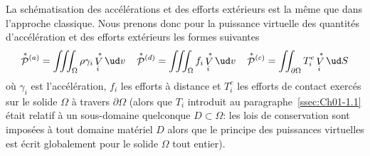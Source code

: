 La schématisation des accélérations et des efforts extérieurs est la même que dans l'approche classique.
Nous prenons donc pour la puissance virtuelle des quantités d'accélération et des efforts extérieurs les formes suivantes
\begin{equation}
    \mathop{\mathcal{P}}^{\ast}{\!}^{(a)} = \iiint_{\Omega} \rho \gamma_i \mathop{V}^{\ast}_i \ud v \quad
    \mathop{\mathcal{P}}^{\ast}{\!}^{(d)} = \iiint_{\Omega} f_i \mathop{V}^{\ast}_i \ud v \quad
    \mathop{\mathcal{P}}^{\ast}{\!}^{(c)} = \iint_{\partial\Omega} T_i^e \mathop{V}^{\ast}_i \ud S
    \label{eq:Ch01-33}
\end{equation}
où $\gamma_i$ est l'accélération, $f_i$ les efforts à distance et $T_i^e$ les efforts de contact exercés sur le solide $\Omega$ à travers $\partial \Omega$ (alors que $T_i$ introduit au paragraphe~\ref{ssec:Ch01-1.1} était relatif à un sous-domaine quelconque $D\subset \Omega$: les lois de conservation sont imposées à tout domaine matériel $D$ alors que le principe des puissances virtuelles est écrit globalement pour le solide $\Omega$ tout entier).

